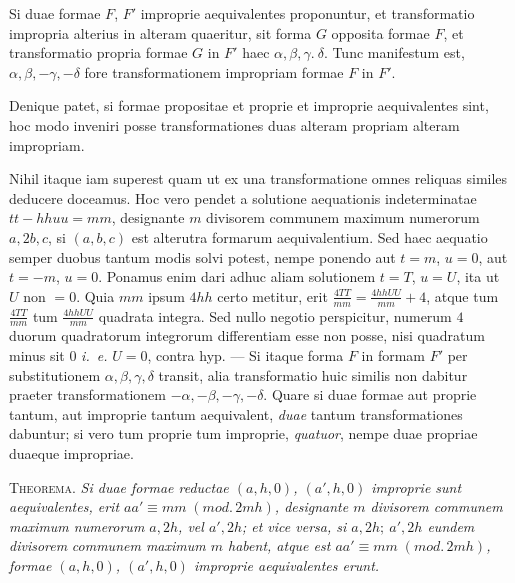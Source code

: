 Si duae formae $F$, $F'$ improprie aequivalentes proponuntur, et transformatio impropria alterius in alteram quaeritur, sit forma $G$ opposita formae $F$, et transformatio propria formae $G$ in $F'$ haec $\alpha,\beta,\gamma.\ \delta$. Tunc manifestum est, $\alpha,\beta,-\gamma,-\delta$ fore transformationem impropriam formae $F$ in $F'$.

Denique patet, si formae propositae et proprie et improprie aequivalentes sint, hoc modo inveniri posse transformationes duas alteram propriam alteram impropriam.

Nihil itaque iam superest quam ut ex una transformatione omnes reliquas similes deducere doceamus. Hoc vero pendet a solutione aequationis indeterminatae $tt-hhuu=mm$, designante $m$ divisorem communem maximum numerorum $a,2b,c$, si $(a,b,c)$ est alterutra formarum aequivalentium. Sed haec aequatio semper duobus tantum modis solvi potest, nempe ponendo aut $t=m$, $u=0$, aut $t=-m$, $u=0$. Ponamus enim dari adhuc aliam solutionem $t=T$, $u=U$, ita ut $U$ non $=0$. Quia $mm$ ipsum $4hh$ certo metitur, erit $\frac{4TT}{mm}=\frac{4hhUU}{mm}+4$, atque tum $\frac{4TT}{mm}$ tum $\frac{4hhUU}{mm}$ quadrata integra. Sed nullo negotio perspicitur, numerum $4$ duorum quadratorum integrorum differentiam esse non posse, nisi quadratum minus sit $0$ \textit{i.~e.} $U=0$, contra hyp. --- Si itaque forma $F$ in formam $F'$ per substitutionem $\alpha,\beta,\gamma,\delta$ transit, alia transformatio huic similis non dabitur praeter transformationem $-\alpha,-\beta,-\gamma,-\delta$. Quare si duae formae aut proprie tantum, aut improprie tantum aequivalent, \textit{duae} tantum transformationes dabuntur; si vero tum proprie tum improprie, \textit{quatuor}, nempe duae propriae duaeque impropriae.

\textsc{Theorema.} \textit{Si duae formae reductae $(a,h,0)$, $(a',h,0)$ improprie sunt aequivalentes, erit $aa'\equiv mm\;(\mathit{mod.}\,2mh)$, designante $m$ divisorem communem maximum numerorum $a,2h$, vel $a',2h$; et vice versa, si $a,2h;\ a',2h$ eundem divisorem}
\textit{communem maximum $m$ habent, atque est $aa'\equiv mm\;(\mathit{mod.}\,2mh)$, formae $(a,h,0)$, $(a',h,0)$ improprie aequivalentes erunt.}

